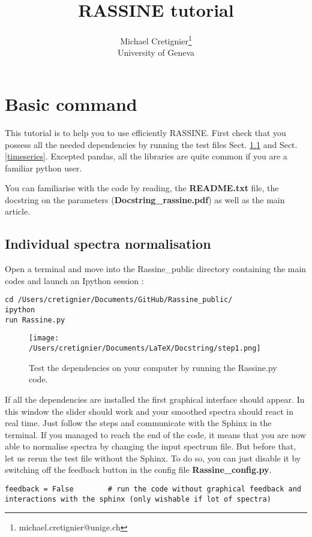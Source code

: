 \documentclass{article}
\begin{document}
	



\title{RASSINE tutorial}

\author{Michael Cretignier\footnote{michael.cretignier@unige.ch} \\ University of Geneva}

\maketitle

\tableofcontents
\newpage
	
\section{Basic command}

This tutorial is to help you to use efficiently RASSINE. First check that you possess all the needed dependencies by running the test files Sect. \ref{individual} and Sect. \ref{timeseries}. Excepted pandas, all the libraries are quite common if you are a familiar python user.
	
You can familiarise with the code by reading, the \textbf{README.txt} file, the docstring on the parameters (\textbf{Docstring\_rassine.pdf}) as well as the main article.
	
\subsection{Individual spectra normalisation}
\label{individual}
	
 Open a terminal and move into the Rassine\_public directory containing the main codes and launch an Ipython session : 


\begin{lstlisting}
cd /Users/cretignier/Documents/GitHub/Rassine_public/
ipython 
run Rassine.py 
\end{lstlisting}

\begin{figure*}[h]
	\centering
	\texttt{[image: /Users/cretignier/Documents/LaTeX/Docstring/step1.png]}
	\caption{Test the dependencies on your computer by running the Rassine.py code.}
	\label{FigInt6}
\end{figure*} 


If all the dependencies are installed the first graphical interface should appear. In this window the slider should work and your smoothed spectra should react in real time. Just follow the steps and communicate with the Sphinx in the terminal. If you managed to reach the end of the code, it means that you are now able to normalise spectra by changing the input spectrum file. But before that, let us rerun the test file without the Sphinx. To do so, you can just disable it by switching off the feedback button in the config file \textbf{Rassine\_config.py}. 
 \begin{lstlisting}
feedback = False        # run the code without graphical feedback and interactions with the sphinx (only wishable if lot of spectra)     
 \end{lstlisting}
 
\end{document}
